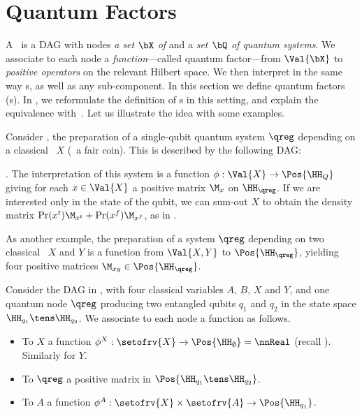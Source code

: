 \section{Quantum Factors}
\label{sec:semantic}

A \QBN\ is a DAG with nodes \emph{a set $\bX$ of \rvs} and a \emph{set $\bQ$ of quantum systems}.
We associate to each node a \emph{function}---called quantum factor---from $\Val{\bX}$ to \emph{positive operators} on the relevant Hilbert space.
We then interpret in the same way \QBN s, as well as any sub-component.
In this section we define quantum factors (\Qfactor s).
In , we reformulate the definition of \QBN s in this setting, and explain the equivalence with~\cite{GBN2014}.
Let us illustrate the idea with some examples.

\begin{example}
Consider , the preparation of a single-qubit quantum system $\qreg$ depending on a classical \rv\ $X$ (\eg\ a fair coin).
This is described by the following DAG:
.
The interpretation of this system is a function $\phi: \Val{X} \to \Pos{\HH_Q}$ giving for each $x \in \Val{X}$ a positive matrix $\M_{x}$ on $\HH_\qreg$.
If we are interested only in the state of the qubit, we can sum-out $X$ to obtain the density matrix $\Pr(x^t) \M_{x^t}+ \Pr(x^f) \M_{x^f}$, as in .

As another example, the preparation of a system $\qreg$ depending on two classical \rvs\ $X$ and $Y$ is a function from $\Val{X,Y}$ to $\Pos{\HH_\qreg}$, yielding four positive matrices $\M_{xy}\in\Pos{\HH_\qreg}$.
\end{example}

\begin{example}
Consider the DAG in , with four classical variables $A$, $B$, $X$ and $Y$, and one quantum node $\qreg$ producing two entangled qubits $q_1$ and $q_2$ in the state space $\HH_{q_1}\tens\HH_{q_2}$.
We associate to each node a function as follows.
\begin{itemize}
\item
To $X$ a function $\phi^X: \setofrv{X}\to\Pos{\HH_{\emptyset}}=\nnReal$ (recall ).
Similarly for $Y$.
\item
To $\qreg$ a positive matrix in $\Pos{\HH_{q_1}\tens\HH_{q_2}}$.
\item
To $A$ a function $\phi^A:\setofrv{X}\times\setofrv{A} \to \Pos{\HH_{q_1}}$.
\end{itemize}
\end{example}

